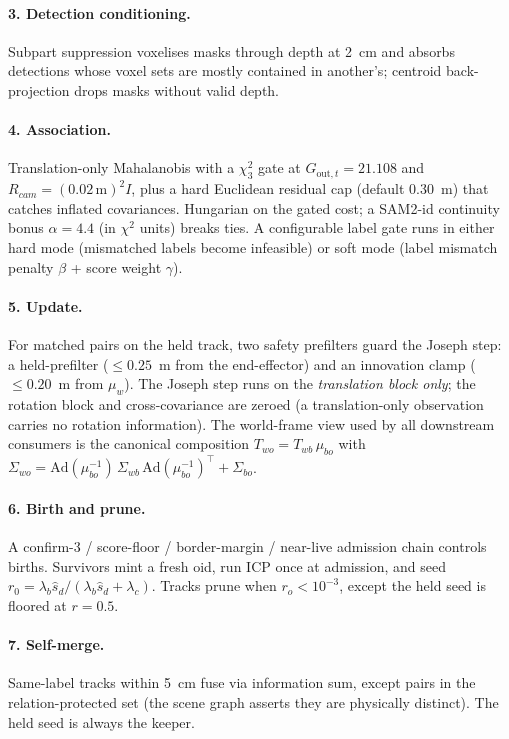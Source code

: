 \documentclass[11pt]{article}
\newcommand{\Ad}{\mathrm{Ad}}
\begin{document}
\paragraph{3. Detection conditioning.} Subpart suppression voxelises masks
through depth at 2~cm and absorbs detections whose voxel sets are mostly
contained in another's; centroid back-projection drops masks without valid
depth.

\paragraph{4. Association.} Translation-only Mahalanobis with a $\chi^2_3$
gate at $G_{\text{out},t}{=}21.108$ and $R_{cam}{=}(0.02\,\mathrm{m})^2 I$,
plus a hard Euclidean residual cap (default 0.30~m) that catches inflated
covariances. Hungarian on the gated cost; a SAM2-id continuity bonus
$\alpha{=}4.4$ (in $\chi^2$ units) breaks ties. A configurable label gate
runs in either hard mode (mismatched labels become infeasible) or soft mode
(label mismatch penalty $\beta$ + score weight $\gamma$).

\paragraph{5. Update.} For matched pairs on the held track, two safety
prefilters guard the Joseph step: a held-prefilter ($\le\!0.25$~m from the
end-effector) and an innovation clamp ($\le\!0.20$~m from $\mu_w$). The
Joseph step runs on the \emph{translation block only}; the rotation block and
cross-covariance are zeroed (a translation-only observation carries no
rotation information). The world-frame view used by all downstream consumers
is the canonical composition $T_{wo}=T_{wb}\,\mu_{bo}$ with
$\Sigma_{wo}=\Ad(\mu_{bo}^{-1})\,\Sigma_{wb}\,\Ad(\mu_{bo}^{-1})^\top
+\Sigma_{bo}$.

\paragraph{6. Birth and prune.} A confirm-3 / score-floor / border-margin /
near-live admission chain controls births. Survivors mint a fresh oid, run
ICP once at admission, and seed $r_0=\lambda_b\hat s_d/(\lambda_b\hat s_d
+\lambda_c)$. Tracks prune when $r_o<10^{-3}$, except the held seed is
floored at $r{=}0.5$.

\paragraph{7. Self-merge.} Same-label tracks within 5~cm fuse via information
sum, except pairs in the relation-protected set (the scene graph asserts
they are physically distinct). The held seed is always the keeper.
\end{document}
